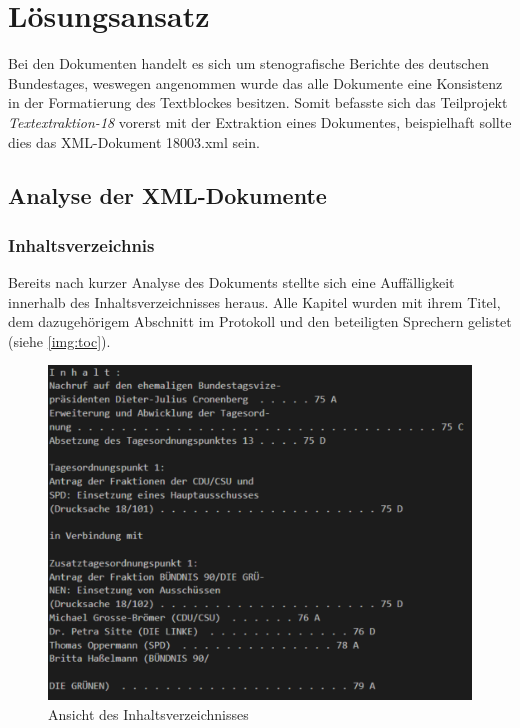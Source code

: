 \chapter{Lösungsansatz}
\label{ch:solution}
Bei den Dokumenten handelt es sich um stenografische Berichte des deutschen Bundestages, weswegen angenommen wurde das alle Dokumente eine Konsistenz in der Formatierung des Textblockes besitzen. Somit befasste sich das Teilprojekt \textit{Textextraktion-18} vorerst mit der Extraktion eines Dokumentes, beispielhaft sollte dies das XML-Dokument 18003.xml sein.
\section{Analyse der XML-Dokumente}
\subsection{Inhaltsverzeichnis}
\label{subsec:toc}
Bereits nach kurzer Analyse des Dokuments stellte sich eine Auffälligkeit innerhalb des Inhaltsverzeichnisses heraus. Alle Kapitel wurden mit ihrem Titel, dem dazugehörigem Abschnitt im Protokoll und den beteiligten Sprechern gelistet (siehe \autoref{img:toc}).
\begin{figure}[h]
	\includegraphics[width=\linewidth]{img/toc.pdf}
	\caption{Ansicht des Inhaltsverzeichnisses}
	\label{img:toc}
\end{figure}\newpage \noindent
